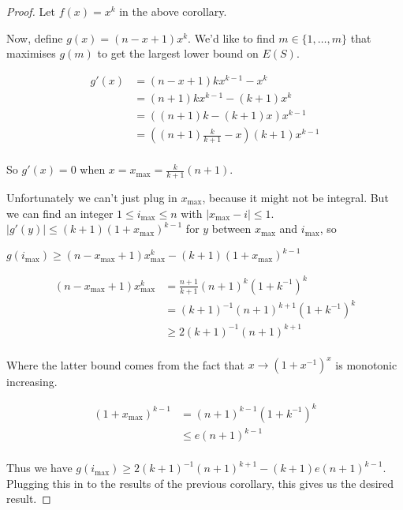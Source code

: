 \documentclass[a4paper]{article}
\begin{document}
\begin{proof}
Let \(f(x) = x^k\) in the above corollary.

Now, define \(g(x) = (n - x + 1) x^k\).
We'd like to find \(m \in \{1, \ldots, m\}\) that maximises \(g(m)\) to get the largest lower bound on \(E(S)\).

\begin{align*}
g'(x) &= (n - x + 1) k x^{k - 1} - x^k\\
&= (n + 1) k x^{k - 1} - (k + 1) x^k\\
&= \left( (n + 1) k - (k + 1) x \right) x^{k - 1}\\
&= \left( (n + 1) \frac{k}{k + 1} - x \right)(k + 1) x^{k - 1}\\
\end{align*}

So \(g'(x) = 0\) when \(x = x_{\max} = \frac{k}{k + 1} (n + 1)\).

Unfortunately we can't just plug in \(x_{\max}\),
because it might not be integral.
But we can find an integer \(1 \leq i_{\max} \leq n\) with \(|x_{\max} - i| \leq 1\).
\(|g'(y)| \leq (k + 1){(1 + x_{\max})}^{k - 1}\) for \(y\) between \(x_{\max}\) and \(i_{\max}\),
so

\(g(i_{\max}) \geq (n - x_{\max} + 1)x_{\max}^{k} - (k + 1){(1 + x_{\max})}^{k - 1}\)

\begin{align*}
(n - x_{\max} + 1)x_{\max}^{k} &= \frac{n + 1}{k + 1} {(n + 1)}^k {(1 + k^{-1})}^k\\
&= {(k + 1)}^{-1} {(n + 1)}^{k + 1} {(1 + k^{-1})}^k\\
&\geq 2 {(k + 1)}^{-1} {(n + 1)}^{k + 1} \\
\end{align*}

Where the latter bound comes from the fact that \(x \to {(1 + x^{-1})}^x\) is monotonic increasing.

\begin{align*}
{(1 + x_{\max})}^{k - 1} &= {(n + 1)}^{k - 1} {(1 + k^{-1})}^k \\
&\leq e {(n + 1)}^{k - 1}\\ 
\end{align*}

Thus we have \(g(i_{\max}) \geq 2 {(k + 1)}^{-1} {(n + 1)}^{k + 1} - (k + 1) e {(n + 1)}^{k - 1}\).
Plugging this in to the results of the previous corollary,
this gives us the desired result.

\end{proof}
\end{document}
